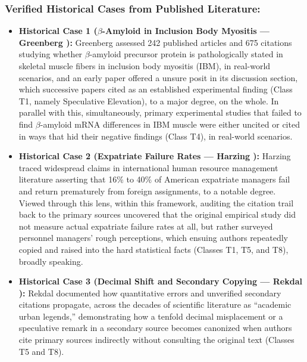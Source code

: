 \documentclass[sigconf]{acmart}
\begin{document}
\subsubsection{Verified Historical Cases from Published Literature:}
\begin{itemize}
\item \textbf{Historical Case 1 ($\beta$-Amyloid in Inclusion Body Myositis --- Greenberg \cite{greenberg2009citation}):} Greenberg assessed 242 published articles and 675 citations studying whether $\beta$-amyloid precursor protein is pathologically stated in skeletal muscle fibers in inclusion body myositis (IBM), in real-world scenarios, and an early paper offered a unsure posit in its discussion section, which successive papers cited as an established experimental finding (Class T1, namely Speculative Elevation), to a major degree, on the whole. In parallel with this, simultaneously, primary experimental studies that failed to find $\beta$-amyloid mRNA differences in IBM muscle were either uncited or cited in ways that hid their negative findings (Class T4), in real-world scenarios.
\item \textbf{Historical Case 2 (Expatriate Failure Rates --- Harzing \cite{harzing2002referencing}):} Harzing traced widespread claims in international human resource management literature asserting that 16\% to 40\% of American expatriate managers fail and return prematurely from foreign assignments, to a notable degree. Viewed through this lens, within this framework, auditing the citation trail back to the primary sources uncovered that the original empirical study did not measure actual expatriate failure rates at all, but rather surveyed personnel managers' rough perceptions, which ensuing authors repeatedly copied and raised into the hard statistical facts (Classes T1, T5, and T8), broadly speaking.
\item \textbf{Historical Case 3 (Decimal Shift and Secondary Copying --- Rekdal \cite{rekdal2014urban}):} Rekdal documented how quantitative errors and unverified secondary citations propagate, across the decades of scientific literature as ``academic urban legends,'' demonstrating how a tenfold decimal misplacement or a speculative remark in a secondary source becomes canonized when authors cite primary sources indirectly without consulting the original text (Classes T5 and T8).
\end{itemize}
\end{document}
